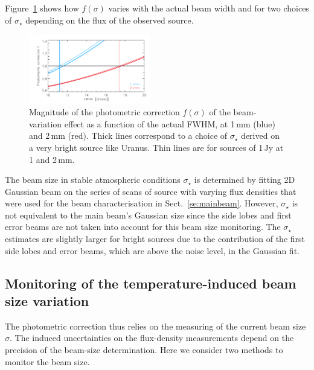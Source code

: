 \documentclass[traditionalabstract]{aa}
\begin{document}
{\begin{appendix}
Figure~\ref{fig:f_sigma} shows how $f(\sigma)$ varies with the actual beam width
and for two choices of $\sigma_\star$ depending on the flux of the observed source.

\begin{figure}[ht!]
  \begin{center}
    \includegraphics[clip=true, trim={0.9cm, 0.1cm, 0.5cm, 0.5cm}, width=0.4725\textwidth]{Figures/photometric_correction_function_1Jy.pdf}
    \caption[Photometric correction]{Magnitude of the photometric
      correction $f(\sigma)$ of the beam-variation effect as a function of the actual FWHM, at 1\,mm (blue)
      and 2\,mm (red). Thick lines correspond to a choice of $\sigma_\star$
      derived on a very bright source like Uranus. Thin lines are for sources of
      1\,Jy at 1 and 2\,mm.}
\label{fig:f_sigma}
\end{center}
\end{figure}


The beam size in stable atmospheric conditions $\sigma_\star$ is
determined by fitting 2D Gaussian beam on the series of scans of
source with varying flux densities that were used for the beam
characterisation in Sect.~\ref{se:mainbeam}. However, $\sigma_\star$
is not equivalent to the main beam's Gaussian size since the side lobes
and first error beams are not taken into account for this beam size
monitoring. The $\sigma_\star$ estimates are slightly
larger for bright sources due to the contribution of the first side
lobes and error beams, which are above the noise level, in the Gaussian fit.


\subsection{Monitoring of the temperature-induced beam size variation}
\label{ap:beam_monitoring}

The photometric correction thus relies on the measuring of the current beam size
$\sigma$. The induced uncertainties on the flux-density measurements depend on
the precision of the beam-size determination. Here we
consider two methods to monitor the beam size.


\end{appendix}}
\end{document}
